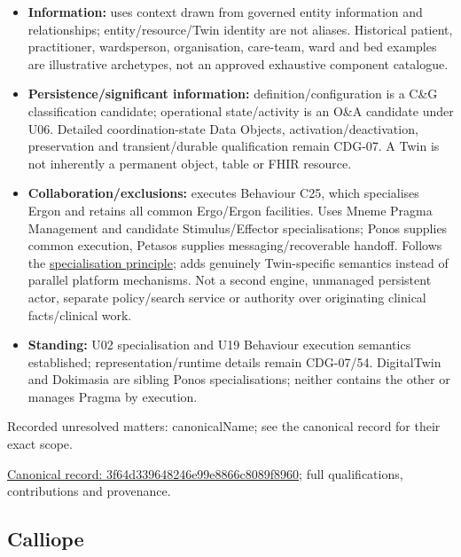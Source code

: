 \begin{itemize}
\item \textbf{Information:} uses context drawn from governed entity information and
  relationships; entity/resource/Twin identity are not aliases. Historical patient,
  practitioner, wardsperson, organisation, care-team, ward and bed examples are
  illustrative archetypes, not an approved exhaustive component catalogue.

\item \textbf{Persistence/significant information:} definition/configuration is a C\&G
  classification candidate; operational state/activity is an O\&A candidate under
  U06. Detailed coordination-state Data Objects, activation/deactivation,
  preservation and transient/durable qualification remain CDG-07. A Twin is not
  inherently a permanent object, table or FHIR resource.

\item \textbf{Collaboration/exclusions:} executes Behaviour C25, which specialises Ergon
  and retains all common Ergo/Ergon facilities. Uses Mneme Pragma Management and
  candidate Stimulus/Effector specialisations; Ponos supplies common execution,
  Petasos supplies messaging/recoverable handoff. Follows the
  \href{\detokenize{../../../../../docs/markdown/05-information-systems-architecture/README.md#specialisation-principle}}{specialisation principle}; adds genuinely
  Twin-specific semantics instead of parallel platform mechanisms.
  Not a second engine, unmanaged persistent actor, separate
  policy/search service or authority over originating clinical facts/clinical work.

\item \textbf{Standing:} U02 specialisation and U19 Behaviour execution semantics established;
  representation/runtime details remain CDG-07/54. DigitalTwin and Dokimasia are sibling
  Ponos specialisations; neither contains the other or manages Pragma by execution.

\end{itemize}

{\small Recorded unresolved matters: canonicalName; see the canonical record for their exact scope.}\par
{\footnotesize \href{../../../../continuum/application/application-component/3f64d339648246e99e8866c8089f8960.md}{Canonical record: 3f64d339648246e99e8866c8089f8960}; full qualifications, contributions and provenance.}\par
\subsection{Calliope}

